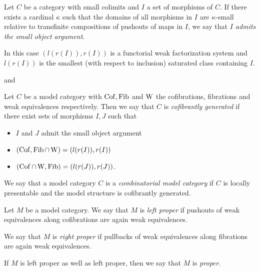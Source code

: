 \begin{thm}[Small Object Argument] %
    Let $C$ be a category with small colimits and $I$ a set of morphisms of $C$.
    If there exists a cardinal $\kappa$ such that the domains of all morphisms in $I$ are $\kappa$-small relative to transfinite compositions of pushouts of maps in $I$, we say that \emph{$I$ admits the small object argument}.
    
    In this case $(l(r(I)),r(I))$ is a functorial weak factorization system and $l(r(I))$ is the smallest (with respect to inclusion) saturated class containing $I$.
\end{thm}
\begin{reference}
    \cite[Theorem 2.1.14]{hovey2007model} and \cite[Proposition 2.1.5]{cisinski_2019}
\end{reference}
\begin{definition}
    Let $C$ be a model category with $\operatorname{Cof},\operatorname{Fib}$ and $\operatorname{W}$ the cofibrations, fibrations and weak equivalences respectively.
    Then we say that $C$ is \emph{cofibrantly generated} if there exist sets of morphisms $I,J$ such that
    \begin{itemize}
        \item $I$ and $J$ admit the small object argument
        \item $(\operatorname{Cof},\operatorname{Fib}\cap\operatorname{W})=(l(r(I)),r(I))$
        \item $(\operatorname{Cof}\cap\operatorname{W},\operatorname{Fib})=(l(r(J)),r(J))$.
    \end{itemize} 
\end{definition}
\begin{definition}
    We say that a model category $C$ is a \emph{combinatorial model category} if $C$ is locally presentable and the model structure is cofibrantly generated.
\end{definition}
\begin{definition}[Properness] %
    Let $M$ be a model category.
    We say that $M$ is \emph{left proper} if pushouts of weak equivalences along cofibrations are again weak equivalences.
    
    We say that $M$ is \emph{right proper} if pullbacks of weak equivalences along fibrations are again weak equivalences.
    
    If $M$ is left proper as well as left proper, then we say that $M$ is \emph{proper}.
\end{definition}
